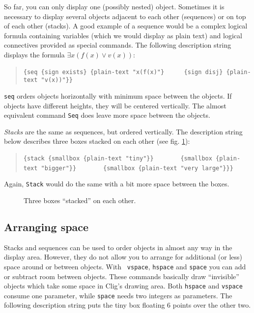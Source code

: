 So far, you can only display one (possibly nested) object. Sometimes it
is necessary to display several objects adjacent to each other
(sequences) or on top of each other (stacks). A good example of a
sequence would be a complex logical formula containing variables (which
we would display as plain text) and logical connectives provided as
special commands. The following description string displays the formula
$\exists x (f(x)\vee v(x))$:

\begin{quote}
\verb'{seq {sign exists} {plain-text "x(f(x)"}' \newline
\verb'     {sign disj} {plain-text "v(x))"}}'
\end{quote}

{\tt seq} orders objects horizontally with minimum space between
the objects. If objects have different heights, they will be centered
vertically. The almost equivalent command {\tt Seq} does leave more
space between the objects.

{\em Stacks\/} are the same as sequences, but ordered vertically. The
description string below describes three boxes stacked on each other
(see fig. \ref{threebox}):

\begin{quote}
\verb'{stack {smallbox {plain-text "tiny"}}' \newline
\verb'       {smallbox {plain-text "bigger"}}' \newline
\verb'       {smallbox {plain-text "very large"}}}'
\end{quote}

Again, {\tt Stack} would do the same with a bit more space between the
boxes.
 
\begin{figure}[hb]
\begin{center}
\leavevmode
{}
\caption{Three boxes ``stacked'' on each other.}
\label{threebox}
\end{center}
\end{figure}

\subsection{Arranging space}

Stacks and sequences can be used to order objects in almost any way in
the display area. However, they do not allow you to arrange for
additional (or less) space around or between objects. With {\tt
vspace}, {\tt hspace} and {\tt space} you can add or subtract room
between objects. These commands basically draw ``invisible'' objects
which take some space in {\sc Clig}'s drawing area. Both {\tt hspace}
and {\tt vspace} consume one parameter, while {\tt space} needs two
integers as parameters. The following description string puts the tiny box
floating 6 points over the other two.

